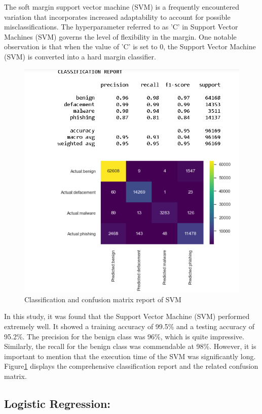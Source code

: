 The soft margin support vector machine (SVM) is a frequently encountered variation that incorporates increased adaptability to account for possible misclassifications. The hyperparameter referred to as 'C' in Support Vector Machines (SVM) governs the level of flexibility in the margin. One notable observation is that when the value of 'C' is set to 0, the Support Vector Machine (SVM) is converted into a hard margin classifier.
\begin{figure}[htb]
\centerline{\includegraphics[width=1\textwidth]{SVMclassification.png}}
\caption{Classification and confusion matrix report of SVM}
\label{Claaification Report of SVM }
\end{figure}

In this study, it was found that the Support Vector Machine (SVM) performed extremely well. It showed a training accuracy of 99.5\% and a testing accuracy of 95.2\%. The precision for the benign class was 96\%, which is quite impressive. Similarly, the recall for the benign class was commendable at 98\%. However, it is important to mention that the execution time of the SVM was significantly long.  Figure\ref{Claaification Report of SVM } displays the comprehensive classification report and the related confusion matrix.

\subsection{Logistic Regression:}



